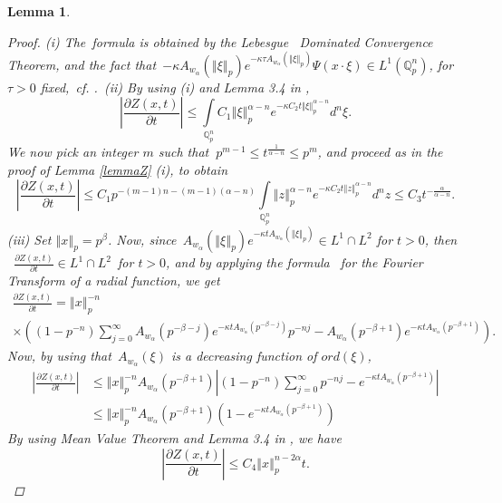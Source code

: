 \documentclass{amsart}\usepackage{amsfonts}
\theoremstyle{plain}
\newtheorem{lemma}[theorem]{Lemma}
\numberwithin{equation}{section}
\begin{document}
\begin{lemma}
\begin{proof}
(i) The\ formula is obtained by the Lebesgue \ Dominated Convergence Theorem,
and the fact that\ $-\kappa A_{w_{\alpha}}(\left\Vert \xi\right\Vert
_{p})e^{-\kappa\tau A_{w_{\alpha}}(\left\Vert \xi\right\Vert _{p})}\Psi
(x\cdot\xi)\in L^{1}(\mathbb{Q}_{p}^{n})$, for $\tau>0$ fixed,\ cf.
\cite[Lemma 3.4]{Ch-Z}.\ (ii) By using (i) and Lemma 3.4 in \cite{Ch-Z},\[
\left\vert \frac{\partial Z(x,t)}{\partial t}\right\vert \leq\underset
{\mathbb{Q}_{p}^{n}}{\int}C_{1}\left\Vert \xi\right\Vert _{p}^{\alpha
-n}e^{-\kappa C_{2}t\left\Vert \xi\right\Vert _{p}^{\alpha-n}}d^{n}\xi.
\]
We now pick an integer $m$ such that $\ p^{m-1}\leq t^{\frac{1}{\alpha-n}}\leq
p^{m}$, and proceed as in the proof of Lemma \ref{lemmaZ} (i), to obtain\[
\left\vert \frac{\partial Z(x,t)}{\partial t}\right\vert \leq C_{1}p^{-(m-1)n-(m-1)(\alpha-n)}\underset{\mathbb{Q}_{p}^{n}}{\int}\left\Vert
z\right\Vert _{p}^{\alpha-n}e^{-\kappa C_{2}t\left\Vert z\right\Vert
_{p}^{\alpha-n}}d^{n}z\leq C_{3}t^{-\frac{\alpha}{\alpha-n}}.
\]
(iii) Set $\left\Vert x\right\Vert _{p}=p^{\beta}$. Now, since\ $A_{w_{\alpha
}}(\left\Vert \xi\right\Vert _{p})e^{-\kappa tA_{w_{\alpha}}(\left\Vert
\xi\right\Vert _{p})}\in L^{1}\cap L^{2}$ for $t>0$, then \ $\frac{\partial
Z(x,t)}{\partial t}\in L^{1}\cap L^{2}$\ for $t>0$, and by applying the
formula \ for the Fourier Transform of a radial function, we get
\begin{multline*}
\frac{\partial Z(x,t)}{\partial t}=\left\Vert x\right\Vert _{p}^{-n}\\
\times\left(  (1-p^{-n})\sum_{j=0}^{\infty}A_{w_{\alpha}}(p^{-\beta
-j})e^{-\kappa tA_{w_{\alpha}}(p^{-\beta-j})}p^{-nj}-A_{w_{\alpha}}(p^{-\beta+1})e^{-\kappa tA_{w_{\alpha}}(p^{-\beta+1})}\right)  .
\end{multline*}
Now, by using that\ $A_{w_{\alpha}}(\xi)$ is a decreasing function of
$ord(\xi)$,
\begin{align*}
\left\vert \frac{\partial Z(x,t)}{\partial t}\right\vert  &  \leq\left\Vert
x\right\Vert _{p}^{-n}A_{w_{\alpha}}(p^{-\beta+1})\left\vert (1-p^{-n})\sum_{j=0}^{\infty}p^{-nj}-e^{-\kappa tA_{w_{\alpha}}(p^{-\beta+1})}\right\vert \\
&  \leq\left\Vert x\right\Vert _{p}^{-n}A_{w_{\alpha}}(p^{-\beta+1})\left(
1-e^{-\kappa tA_{w_{\alpha}}(p^{-\beta+1})}\right)
\end{align*}
By using Mean Value Theorem and Lemma 3.4 in \cite{Ch-Z}, we have\[
\left\vert \frac{\partial Z(x,t)}{\partial t}\right\vert \leq C_{4}\left\Vert
x\right\Vert _{p}^{n-2\alpha}t.
\]
\end{proof}
\end{lemma}
\end{document}
